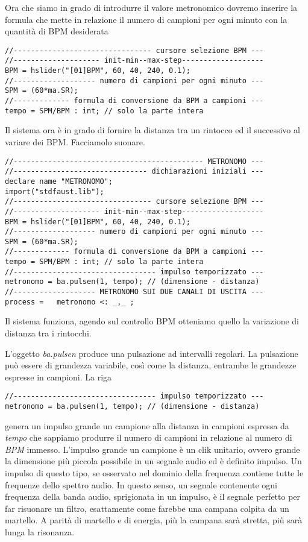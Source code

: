 Ora che siamo in grado di introdurre il valore metronomico dovremo inserire
la formula che mette in relazione il numero di campioni per ogni minuto con la
quantità di BPM desiderata

\begin{lstlisting}
//-------------------------------- cursore selezione BPM ---
//-------------------- init-min--max-step-------------------
BPM = hslider("[01]BPM", 60, 40, 240, 0.1);
//------------------- numero di campioni per ogni minuto ---
SPM = (60*ma.SR);
//------------- formula di conversione da BPM a campioni ---
tempo = SPM/BPM : int; // solo la parte intera
\end{lstlisting}

Il sistema ora è in grado di fornire la distanza tra un rintocco ed il successivo
al variare dei BPM. Facciamolo suonare.

\begin{lstlisting}
//-------------------------------------------- METRONOMO ---
//------------------------------- dichiarazioni iniziali ---
declare name "METRONOMO";
import("stdfaust.lib");
//-------------------------------- cursore selezione BPM ---
//-------------------- init-min--max-step-------------------
BPM = hslider("[01]BPM", 60, 40, 240, 0.1);
//------------------- numero di campioni per ogni minuto ---
SPM = (60*ma.SR);
//------------- formula di conversione da BPM a campioni ---
tempo = SPM/BPM : int; // solo la parte intera
//--------------------------------- impulso temporizzato ---
metronomo = ba.pulsen(1, tempo); // (dimensione - distanza)
//------------------- METRONOMO SUI DUE CANALI DI USCITA ---
process =   metronomo <: _,_ ;
\end{lstlisting}

Il sistema funziona, agendo sul controllo BPM otteniamo quello la variazione di
distanza tra i rintocchi.

L'oggetto \emph{ba.pulsen} produce una pulsazione ad intervalli regolari.
La pulsazione può essere di grandezza variabile, così come la distanza, entrambe
le grandezze espresse in campioni. La riga

\begin{lstlisting}
//--------------------------------- impulso temporizzato ---
metronomo = ba.pulsen(1, tempo); // (dimensione - distanza)
\end{lstlisting}

genera un impulso grande un campione alla distanza in campioni espressa da \emph{tempo}
che sappiamo produrre il numero di campioni in relazione al numero di \emph{BPM} immesso.
L'impulso grande un campione è un clik unitario, ovvero grande la dimensione
più piccola possibile in un segnale audio ed è definito impulso.
Un impulso di questo tipo, se osservato nel dominio della frequenza contiene tutte
le frequenze dello spettro audio. In questo senso, un segnale contenente ogni
frequenza della banda audio, sprigionata in un impulso, è il segnale perfetto per
far risuonare un filtro, esattamente come farebbe una campana colpita da un martello.
A parità di martello e di energia, più la campana sarà stretta, più sarà lunga la risonanza.

